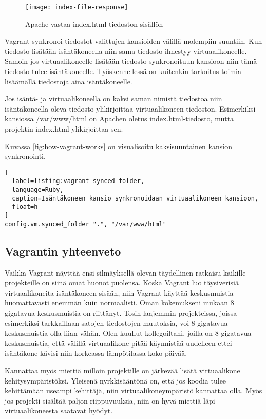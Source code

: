 \begin{figure}[h]
  \texttt{[image: index-file-response]}
  \caption{Apache vastaa index.html tiedoston sisällön}
  \label{fig:index-file-response}
\end{figure}

Vagrant synkronoi tiedostot valittujen kansioiden välillä molempiin suuntiin. Kun tiedosto lisätään isäntäkoneella niin sama tiedosto ilmestyy virtuaalikoneelle. Samoin jos virtuaalikoneelle lisätään tiedosto synkronoituun kansioon niin tämä tiedosto tulee isäntäkoneelle. Työskennellessä on kuitenkin tarkoitus toimia lisäämällä tiedostoja aina isäntäkoneelle.


Jos isäntä- ja virtuaalikoneella on kaksi saman nimistä tiedostoa niin isäntäkoneella oleva tiedosto ylikirjoittaa virtuaalikoneen tiedoston. Esimerkiksi kansiossa /var/www/html on Apachen oletus index.html-tiedosto, mutta projektin index.html ylikirjoittaa sen.

Kuvassa \ref{fig:how-vagrant-works} on visualisoitu kaksisuuntainen kansion synkronointi.

\begin{lstlisting}[
  label=listing:vagrant-synced-folder,
  language=Ruby,
  caption=Isäntäkoneen kansio synkronoidaan virtuaalikoneen kansioon,
  float=h
]
config.vm.synced_folder ".", "/var/www/html"
\end{lstlisting}

\subsection{Vagrantin yhteenveto}

Vaikka Vagrant näyttää ensi silmäyksellä olevan täydellinen ratkaisu kaikille projekteille on siinä omat huonot puolensa. Koska Vagrant luo täysiverisiä virtuaalikoneita isäntäkoneen sisään, niin Vagrant käyttää keskusmuistia huomattavasti enemmän kuin normaalisti. Oman kokemukseni mukaan 8 gigatavua keskusmuistia on riittänyt. Tosin laajemmin projekteissa, joissa esimerkiksi tarkkaillaan satojen tiedostojen muutoksia, voi 8 gigatavua keskusmuistia olla liian vähän. Olen kuullut kollegoiltani, joilla on 8 gigatavua keskusmuistia, että välillä virtuaalikone pitää käynnistää uudelleen ettei isäntäkone kävisi niin korkeassa lämpötilassa koko päivää.

Kannattaa myös miettiä milloin projektille on järkevää lisätä virtuaalikone kehitysympäristöksi. Yleisenä nyrkkisääntönä on, että jos koodia tulee kehittämään useampi kehittäjä, niin virtuaalikoneympäristö kannattaa olla. Myös jos projekti sisältää paljon riippuvuuksia, niin on hyvä miettiä läpi virtuaalikoneesta saatavat hyödyt.

